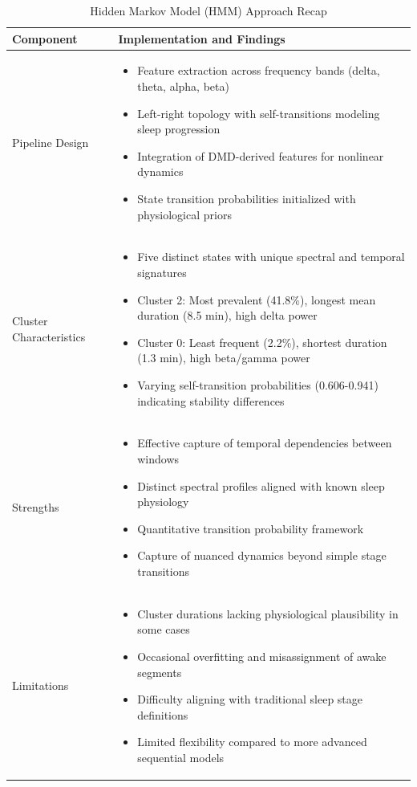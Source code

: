 \documentclass[a4paper,12pt,twoside]{article}
\begin{document}
\begin{table}[H]
\centering
\caption{Hidden Markov Model (HMM) Approach Recap}
\begin{tabular}{|p{3cm}|p{11cm}|}
\hline
\textbf{Component} & \textbf{Implementation and Findings} \\
\hline
Pipeline Design & 
\begin{itemize}
  \item Feature extraction across frequency bands (delta, theta, alpha, beta)
  \item Left-right topology with self-transitions modeling sleep progression
  \item Integration of DMD-derived features for nonlinear dynamics
  \item State transition probabilities initialized with physiological priors
\end{itemize} \\
\hline
Cluster Characteristics & 
\begin{itemize}
  \item Five distinct states with unique spectral and temporal signatures
  \item Cluster 2: Most prevalent (41.8\%), longest mean duration (8.5 min), high delta power
  \item Cluster 0: Least frequent (2.2\%), shortest duration (1.3 min), high beta/gamma power
  \item Varying self-transition probabilities (0.606-0.941) indicating stability differences
\end{itemize} \\
\hline
Strengths & 
\begin{itemize}
  \item Effective capture of temporal dependencies between windows
  \item Distinct spectral profiles aligned with known sleep physiology
  \item Quantitative transition probability framework
  \item Capture of nuanced dynamics beyond simple stage transitions
\end{itemize} \\
\hline
Limitations & 
\begin{itemize}
  \item Cluster durations lacking physiological plausibility in some cases
  \item Occasional overfitting and misassignment of awake segments
  \item Difficulty aligning with traditional sleep stage definitions
  \item Limited flexibility compared to more advanced sequential models
\end{itemize} \\
\hline
\end{tabular}
\label{tab:hmm_summary}
\end{table}
\end{document}
